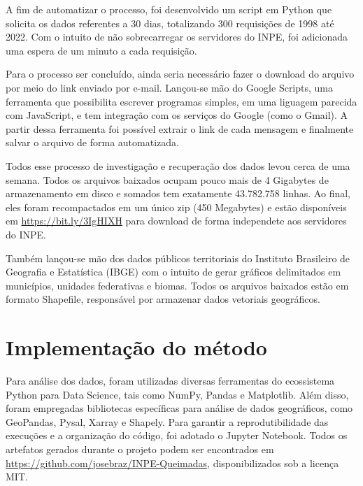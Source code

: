 \documentclass[cic,tc]{iiufrgs}
\begin{document}
A fim de automatizar o processo, foi desenvolvido um script em Python que solicita os dados referentes a 30 dias, totalizando 300 requisições de 1998 até 2022. Com o intuito de não sobrecarregar os servidores do INPE, foi adicionada uma espera de um minuto a cada requisição. \par

Para o processo ser concluído, ainda seria necessário fazer o download do arquivo por meio do link enviado por e-mail. Lançou-se mão do Google Scripts, uma ferramenta que possibilita escrever programas simples, em uma liguagem parecida com JavaScript, e tem integração com os serviços do Google (como o Gmail). A partir dessa ferramenta foi possível extrair o link de cada mensagem e finalmente salvar o arquivo de forma automatizada. \par

Todos esse processo de investigação e recuperação dos dados levou cerca de uma semana. Todos os arquivos baixados ocupam pouco mais de 4 Gigabytes de armazenamento em disco e somados tem exatamente 43.782.758 linhas. Ao final, eles foram recompactados em um único zip (450 Megabytes) e estão disponíveis em \url{https://bit.ly/3IgHIXH} para download de forma independete aos servidores do INPE. \par

Também lançou-se mão dos dados públicos territoriais do Instituto Brasileiro de Geografia e Estatística (IBGE) com o intuito de gerar gráficos delimitados em municípios, unidades federativas e biomas. Todos os arquivos baixados estão em formato Shapefile, responsável por armazenar dados vetoriais geográficos. \par

\section{Implementação do método}

Para análise dos dados, foram utilizadas diversas ferramentas do ecossistema Python para Data Science, tais como NumPy, Pandas e Matplotlib. Além disso, foram empregadas bibliotecas específicas para análise de dados geográficos, como GeoPandas, Pysal, Xarray e Shapely. Para garantir a reprodutibilidade das execuções e a organização do código, foi adotado o Jupyter Notebook. Todos os artefatos gerados durante o projeto podem ser encontrados em \url{https://github.com/josebraz/INPE-Queimadas}, disponibilizados sob a licença MIT. \par
\end{document}
